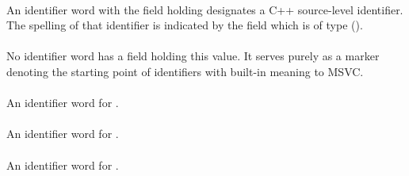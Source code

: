 \paragraph{}
\label{sec:ifc:SourceIdentifier:Plain}

An identifier word with the  field holding 
designates a C++ source-level identifier.  The spelling of that identifier is indicated 
by the  field which is of type  ().

\paragraph{}
\label{sec:ifc:SourceIdentifier:Msvc}

No identifier word has a  field holding this value.  It serves purely as a marker denoting
the starting point of identifiers with built-in meaning to MSVC.

\paragraph{}
\label{sec:ifc:SourceIdentifier:MsvcBuiltinHugeVal}

An identifier word for .

\paragraph{}
\label{sec:ifc:SourceIdentifier:MsvcBuiltinHugeValf}

An identifier word for .


\paragraph{}
\label{sec:ifc:SourceIdentifier:MsvcBuiltinNan}

An identifier word for  .


\paragraph{}
\label{sec:ifc:SourceIdentifier:MsvcBuiltinNanf}

